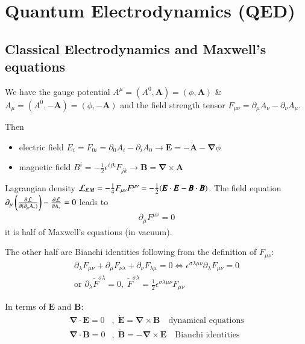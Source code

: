 \chapter{Quantum Electrodynamics (QED)}
\setcounter{chapter}{5}
\section{Classical Electrodynamics and Maxwell's equations}
We have the gauge potential $A^\mu = (A^0, \pmb{A}) = (\phi, \pmb{A})$ \& $A_\mu = (A^0, -\pmb{A}) = (\phi, -\pmb{A})$ and the field strength tensor $F_{\mu\nu} = \partial_\mu A_\nu - \partial_\nu A_\mu$.

Then
\begin{itemize}
	\item electric field $E_i = F_{0i} = \partial_0 A_i - \partial_i A_0 \rightarrow \pmb{E} = -\dot{\pmb{A}} - \pmb{\nabla} \phi$
	\item magnetic field $B^i = -\frac{1}{2} \epsilon^{ijk}F_{jk} \rightarrow \pmb{B} = \pmb{\nabla} \times \pmb{A}$
\end{itemize}

Lagrangian density $\mathcal{L}_{EM} = -\frac{1}{4}F_{\mu\nu}F^{\mu\nu} = -\frac{1}{2} (\pmb{E}\cdot\pmb{E} - \pmb{B}\cdot \pmb{B})$. The field equation $\partial_\mu \left( \frac{\partial \mathcal{L}}{\partial(\partial_\mu A_\nu)} \right) - \frac{\partial \mathcal{L}}{\partial A_\nu} = 0$ leads to
\begin{align}
	\partial_\mu F^{\mu\nu} = 0
\end{align}
it is half of Maxwell's equations (in vacuum).

The other half are Bianchi identities following from the definition of $F_{\mu\nu}$:
\begin{align*}
	\partial_\lambda F_{\mu\nu} + \partial_\mu F_{\nu\lambda} + \partial_\nu F_{\lambda\mu} = 0 \Leftrightarrow \epsilon^{\sigma \lambda \mu \nu}\partial_\lambda F_{\mu\nu} = 0\\
	\text{or } \partial_\lambda \tilde{F}^{\sigma\lambda} = 0,\; \tilde{F}^{\sigma\lambda} = \frac{1}{2} \epsilon^{\sigma\lambda\mu\nu}F_{\mu\nu}
\end{align*}

In terms of $\pmb{E}$ and $\pmb{B}$:
\begin{align*}
	\pmb{\nabla}\cdot \pmb{E} = 0&,\; \dot{\pmb{E}} = \pmb{\nabla}\times \pmb{B} \quad \text{dynamical equations} \\
	\pmb{\nabla}\cdot \pmb{B} = 0&,\; \dot{\pmb{B}} = -\pmb{\nabla}\times \pmb{E} \quad \text{Bianchi identities}
\end{align*}

